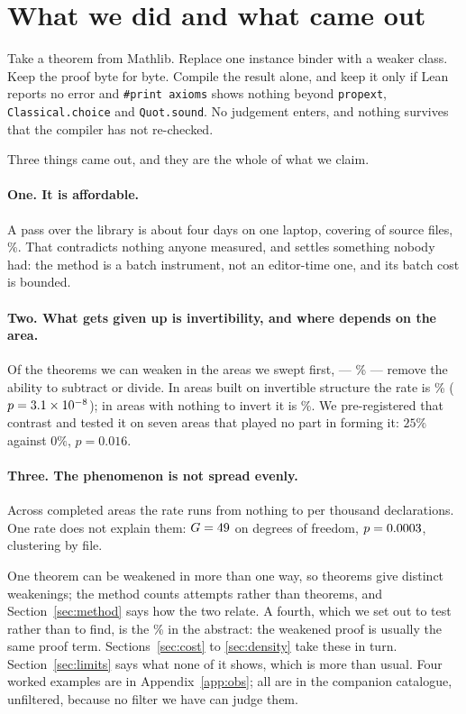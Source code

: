 \documentclass[11pt]{article}
\begin{document}
\section{What we did and what came out}

Take a theorem from Mathlib. Replace one instance binder with a weaker class.
Keep the proof byte for byte. Compile the result alone, and keep it only if Lean
reports no error and \texttt{\#print axioms} shows nothing beyond
\texttt{propext}, \texttt{Classical.choice} and \texttt{Quot.sound}. No
judgement enters, and nothing survives that the compiler has not re-checked.

Three things came out, and they are the whole of what we claim.

\paragraph{One. It is affordable.} A pass over the library is about four days on
one laptop, covering \derivedSweptFiles{} of \libraryFiles{} source files,
\derivedSweptPercent{}\%. That contradicts nothing
anyone measured, and settles something nobody had: the method is a batch
instrument, not an editor-time one, and its batch cost is bounded.

\paragraph{Two. What gets given up is invertibility, and where depends on the
area.} Of the theorems we can weaken in the \areasSweptWord{} areas we swept
first,
\lostInvertibility{} --- \baseLostPercent{}\% --- remove the ability to subtract
or divide. In areas built on invertible structure the rate is
\gradientPercent{}\% ($p = 3.1\times 10^{-8}{}$); in areas with nothing to invert it is
\predictedLostPercent{}\%. We pre-registered that contrast and tested it on seven
areas that played no part in forming it: $25\%$ against $0\%$, $p = 0.016$.

\paragraph{Three. The phenomenon is not spread evenly.} Across \densityAreas{}
completed areas the rate runs from nothing to \densityDensestRate{} per thousand
declarations. One rate does not explain them: $G = 49{}$ on
\densityDf{} degrees of freedom, $p = 0.0003{}$, clustering by file.

One theorem can be weakened in more than one way, so \theoremsWeakened{}
theorems give \allSurvivors{} distinct weakenings; the method counts attempts
rather than theorems, and Section~\ref{sec:method} says how the two relate.
A fourth, which we set out to test rather than to find, is the
\unusedPercent{}\% in the abstract: the weakened proof is usually the same proof
term. Sections~\ref{sec:cost} to \ref{sec:density} take these in turn.
Section~\ref{sec:limits} says what none of it shows, which is more than usual.
Four worked examples are in Appendix~\ref{app:obs}; all \allSurvivors{} are in
the companion catalogue, unfiltered, because no filter we have can judge them.
\end{document}
